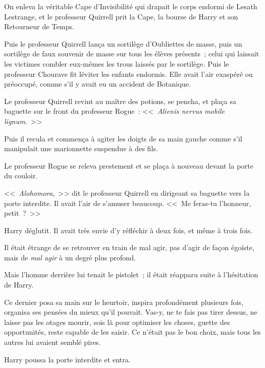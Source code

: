 On enleva la véritable Cape d'Invisibilité qui drapait le corps endormi de Lesath Lestrange, et le professeur Quirrell prit la Cape, la bourse de Harry et son Retourneur de Temps.

Puis le professeur Quirrell lança un sortilège d'Oubliettes de masse, puis un sortilège de faux souvenir de masse sur tous les élèves présents~; celui qui laissait les victimes combler eux-mêmes les trous laissés par le sortilège. Puis le professeur Chourave fit léviter les enfants endormis. Elle avait l'air exaspéré ou préoccupé, comme s'il y avait eu un accident de Botanique.

Le professeur Quirrell revint au maître des potions, se pencha, et plaça sa baguette sur le front du professeur Rogue~: <<~\emph{Alienis nervus mobile lignum}.~>>

Puis il recula et commença à agiter les doigts de sa main gauche comme s'il manipulait une marionnette suspendue à des fils.

Le professeur Rogue se releva prestement et se plaça à nouveau devant la porte du couloir.

<<~\emph{Alohomora},~>> dit le professeur Quirrell en dirigeant sa baguette vers la porte interdite. Il avait l'air de s'amuser beaucoup. <<~Me feras-tu l'honneur, petit~?~>>

Harry déglutit. Il avait très envie d'y réfléchir à deux fois, et même à trois fois.

Il était étrange de se retrouver en train de mal agir, pas d'agir de façon égoïste, mais de \emph{mal agir} à un degré plus profond.

Mais l'homme derrière lui tenait le pistolet~; il était réapparu suite à l'hésitation de Harry.

Ce dernier posa sa main sur le heurtoir, inspira profondément plusieurs fois, organisa ses pensées du mieux qu'il pouvait. Vas-y, ne te fais pas tirer dessus, ne laisse pas les otages mourir, sois là pour optimiser les choses, guette des opportunités, reste capable de les saisir. Ce n'était pas le bon choix, mais tous les autres lui avaient semblé pires.

Harry poussa la porte interdite et entra.
